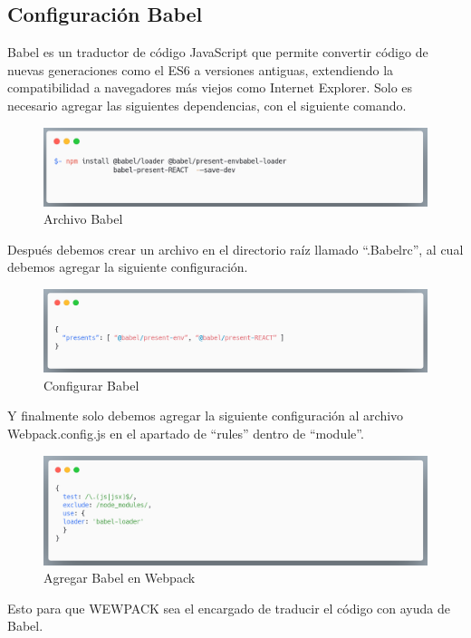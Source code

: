     \subsection{Configuración Babel}
    Babel es un traductor de código JavaScript que permite convertir código de nuevas generaciones como el ES6 a versiones antiguas, extendiendo la compatibilidad a navegadores más viejos como Internet Explorer.
    Solo es necesario agregar las siguientes dependencias, con el siguiente comando.
    \newline
    \newline
     \begin{figure}[H]
    \includegraphics[width=1\textwidth]{./Imagenes/image36.png}
     \caption[Archivo Babel]{Archivo Babel}
         \end{figure}
    \newline
    \newline
    Después debemos crear un archivo en el directorio raíz llamado “.Babelrc”, al cual debemos agregar la siguiente configuración.
    \newline
    \newline
     \begin{figure}[H]
    \includegraphics[width=1\textwidth]{./Imagenes/image17.png}
    \caption[Configurar Babel]{Configurar Babel}
    \end{figure}
    \newline
    \newline
    Y finalmente solo debemos agregar la siguiente configuración al archivo Webpack.config.js en el apartado de “rules” dentro de “module”.
    \newline
    \newline
     \begin{figure}[H]
    \includegraphics[width=1\textwidth]{./Imagenes/image1.png}
    \caption[Agregar Babel en Webpack]{Agregar Babel en Webpack}
    \end{figure}
    \newline
    \newline
    Esto para que WEWPACK sea el encargado de traducir el código con ayuda de Babel.
    
